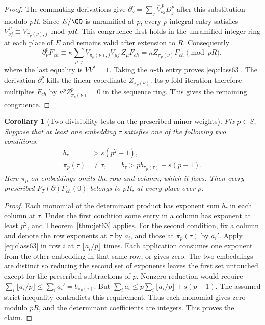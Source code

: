\documentclass[a4paper,11pt]{article}
\newtheorem{corollary}[proposition]{Corollary}
\theoremstyle{definition}
\theoremstyle{remark}
\numberwithin{equation}{section}
\begin{document}
\begin{proof}
The commuting derivations give
\(\partial_\nu^p=\sum_j\overline V_{\nu j}^{\,p}D_j^p\)
after this substitution modulo \(pR\). Since \(E/\QQ\) is
unramified at \(p\), every \(p\)-integral entry satisfies
\(\overline V_{\nu j}^{\,p}\equiv V_{\pi_p(\nu),j}\bmod pR\).
This congruence first holds in the unramified integer ring at
each place of \(E\) and remains valid after extension to \(R\).
Consequently
\[
 \partial_\nu^p F_{ch}
 \equiv\kappa\sum_{\mu,j}V_{\pi_p(\nu),j}
                         \overline V_{\mu j}\,Z_\mu F_{ch}
        =\kappa Z_{\pi_p(\nu)}F_{ch}\pmod{pR},
\]
where the last equality is \(VV^*=1\). Taking the
\(\alpha\)-th entry proves \eqref{eq:class63}.
The derivation \(\partial_\nu^p\) kills the linear coordinate
\(Z_{\pi_p(\nu)}\). Its \(p\)-fold iteration therefore
multiplies \(F_{ch}\) by \(\kappa^pZ_{\pi_p(\nu)}^p=0\) in
the sequence ring. This gives the remaining congruence.
\end{proof}

\begin{corollary}[Two divisibility tests on the prescribed minor weights]\label{cor:min63}
Fix \(p\in S\). Suppose that at least one embedding \(\tau\)
satisfies one of the following two conditions.
\begin{align*}
    b_\tau&>s(p^2-1),\\
    \pi_p(\tau)&\ne\tau,\qquad
    b_\tau>p b_{\pi_p(\tau)}+s(p-1).
\end{align*}
Here \(\pi_p\) on embeddings omits the row and column, which it
fixes. Then every prescribed \(P_T(\partial)F_{ch}(0)\) belongs
to \(pR\), at every place over \(p\).
\end{corollary}
\begin{proof}
Each monomial of the determinant product has exponent sum \(b_\tau\)
in each column at \(\tau\). Under the first condition some entry
in a column has exponent at least \(p^2\), and Theorem~\ref{thm:jet63}
applies. For the second condition, fix a column and denote the
row exponents at \(\tau\) by \(a_i\), and those at \(\pi_p(\tau)\)
by \(a_i'\). Apply \eqref{eq:class63} in row \(i\) at \(\tau\)
\(\lfloor a_i/p\rfloor\) times. Each application consumes one
exponent from the other embedding in that same row, or gives zero.
The two embeddings are distinct so reducing the second set of
exponents leaves the first set untouched except for the prescribed
subtractions of \(p\). Nonzero reduction would require
\(\sum_i\lfloor a_i/p\rfloor\le\sum_i a_i'=b_{\pi_p(\tau)}\).
But \(\sum_i a_i\le p\sum_i\lfloor a_i/p\rfloor+s(p-1)\).
The assumed strict inequality contradicts this requirement.
Thus each monomial gives zero modulo \(pR\), and the determinant
coefficients are integers. This proves the claim.
\end{proof}
\end{document}
